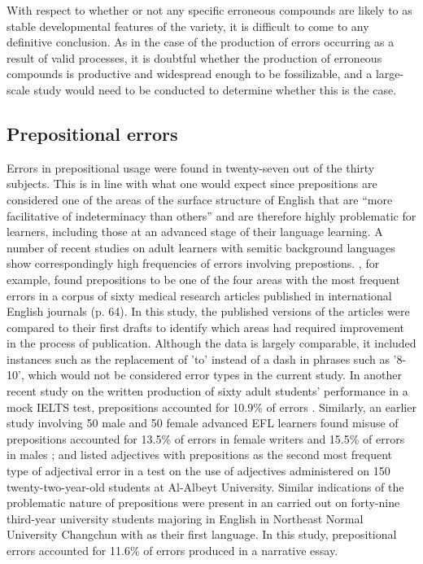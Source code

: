 \documentclass[output=paper]{langsci/langscibook}
\begin{document}
With respect to whether or not any specific erroneous  compounds
are likely to  as stable developmental features of the
variety, it is difficult to come to any definitive conclusion. As in
the case of the production of errors occurring as a result of valid
 processes, it is doubtful whether the production of
erroneous  compounds is productive and widespread enough to be
fossilizable, and a large-scale study would need to be conducted to
determine whether this is the case.


\subsection{Prepositional errors}

Errors in prepositional usage were found in twenty-seven out of the
thirty subjects. This is in line with what one would expect since
prepositions are considered one of the areas of the surface structure
of English that are “more facilitative of indeterminacy than others”
\citep[205]{Jain1974} and are therefore highly problematic for
learners, including those at an advanced stage of their language
learning. A number of recent studies on adult learners with semitic
background languages show correspondingly high frequencies of errors
involving prepostions. \citet{GholamiZeinolabedini2015}, for
example, found prepositions to be one of the four  areas
with the most frequent errors in a corpus of sixty  medical
research articles published in international English journals
(p. 64). In this study, the published versions of the articles were
compared to their first drafts to identify which areas had required
 improvement in the process of publication. Although 
the data is largely comparable, it included instances such as the replacement of 
'to' instead of a dash in phrases such as '8-10', which 
would not be considered error types in the current study. In another
recent study on the written production of sixty  adult
students’ performance in a mock IELTS test, prepositions accounted for
10.9\% of  errors \citep{NosratiNafisi2015}. Similarly, an
earlier study involving 50 male and 50 female advanced  EFL
learners found misuse of prepositions accounted for 13.5\% of
 errors in female writers and 15.5\% of  errors in
males \citep{BoroomandRostami2013}; and \citet{Al-HarafshehPandian2012} listed
adjectives with prepositions as the second most frequent type of
adjectival error in a test on the use of adjectives administered on
150 twenty-two-year-old  students at Al-Albeyt
University. Similar indications of the problematic nature of
prepositions were present in an  carried out on
forty-nine third-year university students majoring in English in
Northeast Normal University Changchun with  as their first
language. In this study, prepositional errors accounted for 11.6\% of
errors produced in a narrative essay.
\end{document}
